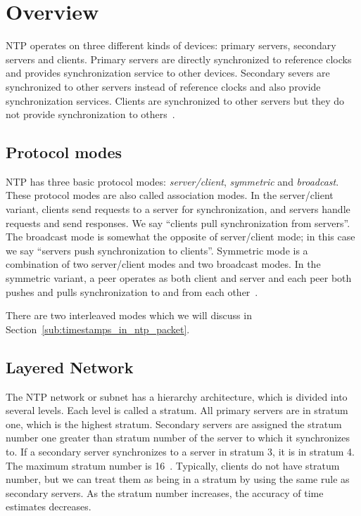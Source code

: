 
\chapter{Overview}
NTP operates on three different kinds of devices: primary servers, secondary
servers and clients. Primary servers are directly synchronized to reference
clocks and provides synchronization service to other devices.  Secondary severs
are synchronized to other servers instead of reference clocks and also provide
synchronization services. Clients are synchronized to other servers but they do
not provide synchronization to others~\cite{rfc5905}.

\section{Protocol modes}%
\label{sec:protocol_modes}
NTP has three basic protocol modes: \emph{server/client}, \emph{symmetric}
and \emph{broadcast}. These protocol modes are also called association modes. 
In the server/client variant, clients send requests to a server for
synchronization, and servers handle requests and send responses. We say
``clients pull synchronization from servers''. The broadcast mode is somewhat
the opposite of server/client mode; in this case we say ``servers push
synchronization to clients''. Symmetric mode is a combination of two
server/client modes and two broadcast modes. In the symmetric variant, a peer
operates as both client and server and each peer both pushes and pulls
synchronization to and from each other~\cite{rfc5905}.

There are two interleaved modes which we will discuss in
Section~\ref{sub:timestamps_in_ntp_packet}.

\section{Layered Network}
\label{sec:Layered_network}
The NTP network or subnet has a hierarchy architecture, which is divided into
several levels. Each level is called a stratum. All primary servers are in
stratum one, which is the highest stratum. Secondary servers are assigned the
stratum number one greater than stratum number of the server to which it
synchronizes to. If a secondary server synchronizes to a server in stratum 3,
it is in stratum 4. The maximum stratum number is 16~\cite{rfc5905}.
Typically, clients do not have stratum number, but we can treat them as being
in a stratum by using the same rule as secondary servers.  As the stratum
number increases, the accuracy of time estimates decreases.

